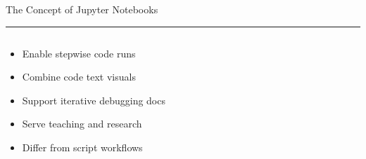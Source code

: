 \documentclass[aspectratio=169]{beamer}
\newcommand{\TitleFont}{\rmfamily}
\begin{document}
\begin{frame}[t]{}
  \vspace*{0.5cm}
  {\TitleFont\fontsize{18}{22}\selectfont\color{LUBronze}The Concept of Jupyter Notebooks\par}
  \vspace{0.3em}
  {\color{LUBronze}\rule{\linewidth}{0.8pt}}\par
  \vspace{0.2cm}
  \begin{columns}[t]
    \begin{column}[t]{0.4\textwidth}
      \vspace*{0pt}
      \begin{itemize}\setlength\itemsep{0.65em}
        \item Enable stepwise code runs
        \item Combine code text visuals
        \item Support iterative debugging docs
        \item Serve teaching and research
        \item Differ from script workflows
      \end{itemize}
    \end{column}
  \end{columns}
\end{frame}
\end{document}
